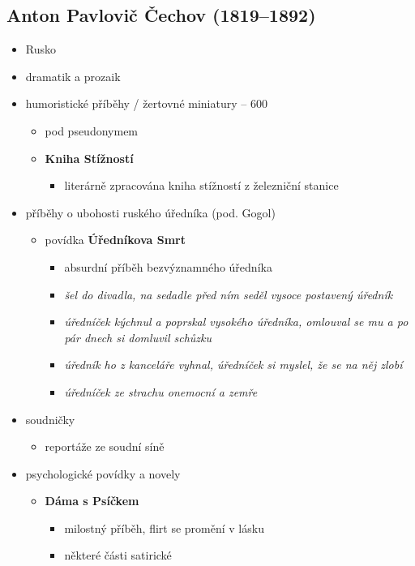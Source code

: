 \subsection{Anton Pavlovič Čechov (1819--1892)}
\begin{itemize}
\item Rusko
\item dramatik a prozaik
\item humoristické příběhy / žertovné miniatury -- 600
	\begin{itemize}
	\item pod pseudonymem
	\item \textbf{Kniha Stížností}
		\begin{itemize}
		\item literárně zpracována kniha stížností z železniční stanice
		\end{itemize}	
	\end{itemize}
\item příběhy o ubohosti ruského úředníka (pod. Gogol)
	\begin{itemize}
	\item povídka \textbf{Úředníkova Smrt}
		\begin{itemize}
		\item absurdní příběh bezvýznamného úředníka
		\item \textit{šel do divadla, na sedadle před ním seděl vysoce postavený úředník}
		\item \textit{úředníček kýchnul a poprskal vysokého úředníka, omlouval se mu a po pár dnech si domluvil schůzku}
		\item \textit{úředník ho z kanceláře vyhnal, úředníček si myslel, že se na něj zlobí}
		\item \textit{úředníček ze strachu onemocní a zemře}
		\end{itemize}
	\end{itemize}
\item soudničky
	\begin{itemize}
	\item reportáže ze soudní síně
	\end{itemize}
\item psychologické povídky a novely
	\begin{itemize}
	\item \textbf{Dáma s Psíčkem}
		\begin{itemize}
		\item milostný příběh, flirt se promění v lásku
		\item některé části satirické
		\end{itemize}

\end{itemize}
\end{itemize}
